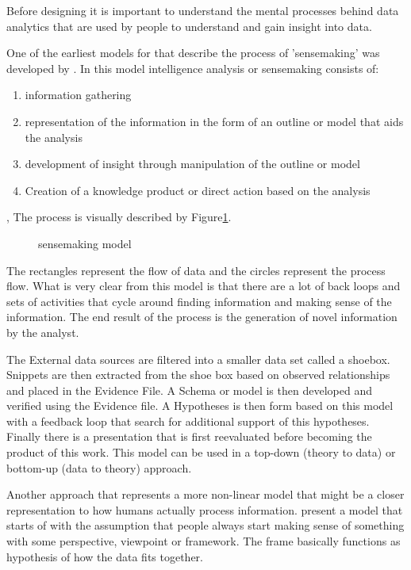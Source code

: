 Before designing it is important to understand the mental processes behind data analytics that are used by people to understand and gain insight into data.

One of the earliest  models for that describe the process of 'sensemaking' was developed by \cite{pirolli2005sensemaking}. In this model intelligence analysis or sensemaking  consists of:
\begin{enumerate}
	\item information gathering
	\item representation of the information in the form of an outline or model that aids the analysis
	\item development of insight through manipulation of the outline or model
	\item Creation of a knowledge product or direct action based on the analysis
\end{enumerate}, 
The process is visually described by Figure\ref{fig:3}.
\begin{figure}[!ht]
	\centering{}
	\caption{\cite{pirolli2005sensemaking} sensemaking model}\label{fig:3}
\end{figure}

The rectangles represent the flow of data and the circles represent the process flow. What is very clear from this model is that there are a lot of back loops and sets of activities that cycle around finding information and making sense of the information. The end result of the process is the generation of novel information by the analyst.

The External data sources are filtered into a smaller data set called a shoebox. Snippets are then extracted from the shoe box based on observed relationships and placed in the Evidence File. A Schema or model is then developed and verified using the Evidence file. A Hypotheses is then form based on this model with a feedback loop that search for additional support of this hypotheses. Finally there is a presentation that is first reevaluated before becoming the product of this work. This model can be used in a top-down (theory to data)  or bottom-up (data to theory) approach.

Another approach that represents a more non-linear model that might be a closer representation to how humans actually process information. \cite{klein2006making} present a model that starts of with the assumption that people always start making sense of something with some perspective, viewpoint or framework. The frame basically functions as hypothesis of how the data fits together.

